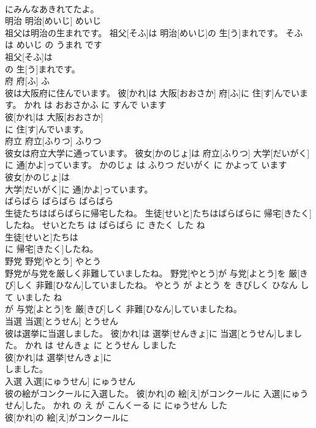 \documentclass[8pt]{extreport}
\begin{document}
\begin{CJK}{UTF8}{min}
\\	にみんなあきれてたよ。			
\\	明治	明治[めいじ]	めいじ	
\\	祖父は明治の生まれです。	祖父[そふ]は 明治[めいじ]の 生[う]まれです。	そふ は めいじ の うまれ です	
\\	祖父[そふ]は
\\	の 生[う]まれです。			
\\	府	府[ふ]	ふ	
\\	彼は大阪府に住んでいます。	彼[かれ]は 大阪[おおさか] 府[ふ]に 住[す]んでいます。	かれ は おおさかふ に すんで います	
\\	彼[かれ]は 大阪[おおさか]
\\	に 住[す]んでいます。			
\\	府立	府立[ふりつ]	ふりつ	
\\	彼女は府立大学に通っています。	彼女[かのじょ]は 府立[ふりつ] 大学[だいがく]に 通[かよ]っています。	かのじょ は ふりつ だいがく に かよって います	
\\	彼女[かのじょ]は
\\	大学[だいがく]に 通[かよ]っています。			
\\	ばらばら	ばらばら	ばらばら	
\\	生徒たちはばらばらに帰宅したね。	生徒[せいと]たちはばらばらに 帰宅[きたく]したね。	せいとたち は ばらばら に きたく した ね	
\\	生徒[せいと]たちは
\\	に 帰宅[きたく]したね。			
\\	野党	野党[やとう]	やとう	
\\	野党が与党を厳しく非難していましたね。	野党[やとう]が 与党[よとう]を 厳[きび]しく 非難[ひなん]していましたね。	やとう が よとう を きびしく ひなん して いました ね	
\\	が 与党[よとう]を 厳[きび]しく 非難[ひなん]していましたね。			
\\	当選	当選[とうせん]	とうせん	
\\	彼は選挙に当選しました。	彼[かれ]は 選挙[せんきょ]に 当選[とうせん]しました。	かれ は せんきょ に とうせん しました	
\\	彼[かれ]は 選挙[せんきょ]に
\\	しました。			
\\	入選	入選[にゅうせん]	にゅうせん	
\\	彼の絵がコンクールに入選した。	彼[かれ]の 絵[え]がコンクールに 入選[にゅうせん]した。	かれ の え が こんくーる に にゅうせん した	
\\	彼[かれ]の 絵[え]がコンクールに

\end{CJK}
\end{document}
